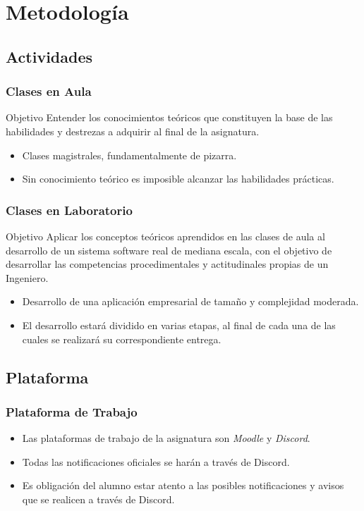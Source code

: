 \documentclass[a4paper,t,xcolor=pst,colortheme]{beamer}
\begin{document}
\section{Metodología}

\subsection{Actividades}

\begin{frame}[t]
	\frametitle{Clases en Aula}
	\begin{block}{Objetivo}
		Entender los conocimientos teóricos que constituyen la base de las habilidades y destrezas a adquirir al final de la asignatura.
	\end{block}
	\begin{itemize}
		\item<2-> Clases magistrales, fundamentalmente de pizarra.
		\item<3-> Sin conocimiento teórico es imposible alcanzar las habilidades prácticas.
	\end{itemize}
\end{frame}

\begin{frame}
	\frametitle{Clases en Laboratorio}
	\begin{block}{Objetivo}
		Aplicar los conceptos teóricos aprendidos en las clases de aula al desarrollo de un sistema software real de mediana escala, con el objetivo de desarrollar las competencias procedimentales y actitudinales propias de un Ingeniero.
	\end{block}
	\begin{itemize}
		\item<2-> Desarrollo de una aplicación empresarial de tamaño y complejidad moderada.
		\item<3-> El desarrollo estará dividido en varias etapas, al final de cada una de las cuales se realizará su correspondiente entrega.
	\end{itemize}
\end{frame}

\subsection{Plataforma}

\begin{frame}[c]
	\frametitle{Plataforma de Trabajo}
	\begin{itemize}
		\item<1-> Las plataformas de trabajo de la asignatura son \emph{Moodle} y \emph{Discord}.
		\item<2-> Todas las notificaciones oficiales se harán a través de Discord.
		\item<3-> Es obligación del alumno estar atento a las posibles notificaciones y avisos que se realicen a través de Discord.
	\end{itemize}
\end{frame}
\end{document}
